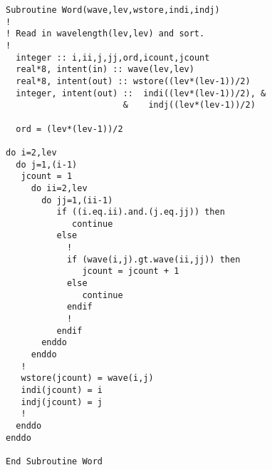 \begin{appendices}
\begin{verbatim}
Subroutine Word(wave,lev,wstore,indi,indj)
!
! Read in wavelength(lev,lev) and sort.
!
  integer :: i,ii,j,jj,ord,icount,jcount
  real*8, intent(in) :: wave(lev,lev)
  real*8, intent(out) :: wstore((lev*(lev-1))/2)
  integer, intent(out) ::  indi((lev*(lev-1))/2), &
                       &    indj((lev*(lev-1))/2)

  ord = (lev*(lev-1))/2

do i=2,lev
  do j=1,(i-1)
   jcount = 1
     do ii=2,lev
       do jj=1,(ii-1)
          if ((i.eq.ii).and.(j.eq.jj)) then
             continue
          else
            !
            if (wave(i,j).gt.wave(ii,jj)) then
               jcount = jcount + 1
            else
               continue
            endif
            !
          endif
       enddo
     enddo
   !
   wstore(jcount) = wave(i,j)
   indi(jcount) = i
   indj(jcount) = j
   !
  enddo
enddo

End Subroutine Word

\end{verbatim}
\end{appendices}